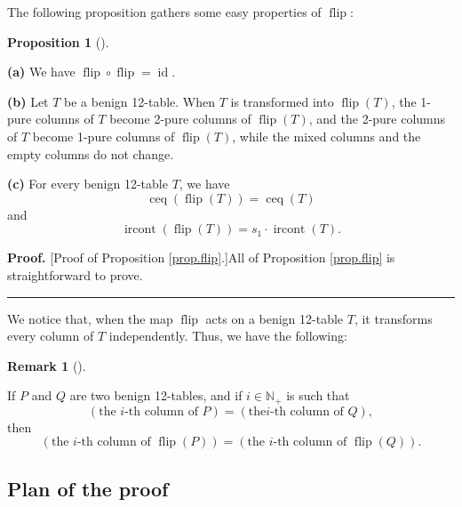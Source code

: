 \documentclass[numbers=enddot,12pt,final,onecolumn,notitlepage]{scrartcl}%
\theoremstyle{definition}
\newtheorem{prop}[theo]{Proposition}
\newenvironment{proposition}[1][]
{\begin{prop}[#1]\begin{leftbar}}
{\end{leftbar}\end{prop}}
\newtheorem{remk}[theo]{Remark}
\newenvironment{remark}[1][]
{\begin{remk}[#1]\begin{leftbar}}
{\end{leftbar}\end{remk}}
\newenvironment{proof}[1][Proof]{\noindent\textbf{#1.} }{\ \rule{0.5em}{0.5em}}
\begin{document}
The following proposition gathers some easy properties of
$\operatorname*{flip}$:

\begin{proposition}
\label{prop.flip}\textbf{(a)} We have $\operatorname*{flip}\circ
\operatorname*{flip}=\operatorname*{id}$.

\textbf{(b)} Let $T$ be a benign 12-table. When $T$ is transformed into
$\operatorname*{flip}\left(  T\right)  $, the 1-pure columns of $T$ become
2-pure columns of $\operatorname*{flip}\left(  T\right)  $, and the 2-pure
columns of $T$ become 1-pure columns of $\operatorname*{flip}\left(  T\right)
$, while the mixed columns and the empty columns do not change.

\textbf{(c)} For every benign 12-table $T$, we have%
\begin{equation}
\operatorname*{ceq}\left(  \operatorname*{flip}\left(  T\right)  \right)
=\operatorname*{ceq}\left(  T\right)  \label{pf.lem.BK.flip.ceq}%
\end{equation}
and%
\begin{equation}
\operatorname*{ircont}\left(  \operatorname*{flip}\left(  T\right)  \right)
=s_{1}\cdot\operatorname*{ircont}\left(  T\right)  .
\label{pf.lem.BK.flip.ircont}%
\end{equation}

\end{proposition}

\begin{proof}
[Proof of Proposition \ref{prop.flip}.]All of Proposition \ref{prop.flip} is
straightforward to prove.
\end{proof}

We notice that, when the map $\operatorname*{flip}$ acts on a benign 12-table
$T$, it transforms every column of $T$ independently. Thus, we have the following:

\begin{remark}
\label{rmk.flip.independent}If $P$ and $Q$ are two benign 12-tables, and if
$i\in\mathbb{N}_{+}$ is such that%
\[
\left(  \text{the }i\text{-th column of }P\right)  =\left(  \text{the
}i\text{-th column of }Q\right)  ,
\]
then%
\[
\left(  \text{the }i\text{-th column of }\operatorname*{flip}\left(  P\right)
\right)  =\left(  \text{the }i\text{-th column of }\operatorname*{flip}\left(
Q\right)  \right)  .
\]

\end{remark}

\subsection{Plan of the proof}
\end{document}
